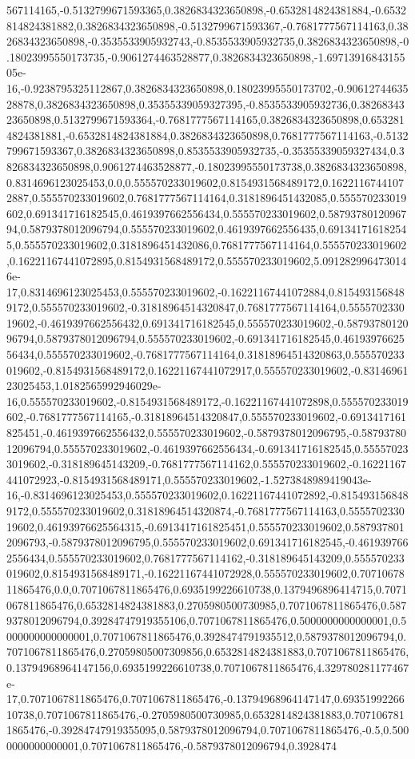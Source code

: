 567114165,-0.5132799671593365,0.3826834323650898,-0.6532814824381884,-0.6532814824381882,0.3826834323650898,-0.5132799671593367,-0.7681777567114163,0.3826834323650898,-0.3535533905932743,-0.8535533905932735,0.3826834323650898,-0.18023995550173735,-0.9061274463528877,0.3826834323650898,-1.6971391684315505e-16,-0.9238795325112867,0.3826834323650898,0.18023995550173702,-0.9061274463528878,0.3826834323650898,0.35355339059327395,-0.8535533905932736,0.3826834323650898,0.5132799671593364,-0.7681777567114165,0.3826834323650898,0.6532814824381881,-0.6532814824381884,0.3826834323650898,0.7681777567114163,-0.5132799671593367,0.3826834323650898,0.8535533905932735,-0.35355339059327434,0.3826834323650898,0.9061274463528877,-0.18023995550173738,0.3826834323650898,0.8314696123025453,0.0,0.555570233019602,0.8154931568489172,0.16221167441072887,0.555570233019602,0.7681777567114164,0.3181896451432085,0.555570233019602,0.691341716182545,0.4619397662556434,0.555570233019602,0.5879378012096794,0.5879378012096794,0.555570233019602,0.4619397662556435,0.691341716182545,0.555570233019602,0.3181896451432086,0.7681777567114164,0.555570233019602,0.16221167441072895,0.8154931568489172,0.555570233019602,5.0912829964730146e-17,0.8314696123025453,0.555570233019602,-0.16221167441072884,0.8154931568489172,0.555570233019602,-0.31818964514320847,0.7681777567114164,0.555570233019602,-0.4619397662556432,0.691341716182545,0.555570233019602,-0.5879378012096794,0.5879378012096794,0.555570233019602,-0.691341716182545,0.4619397662556434,0.555570233019602,-0.7681777567114164,0.31818964514320863,0.555570233019602,-0.8154931568489172,0.16221167441072917,0.555570233019602,-0.8314696123025453,1.0182565992946029e-16,0.555570233019602,-0.8154931568489172,-0.16221167441072898,0.555570233019602,-0.7681777567114165,-0.31818964514320847,0.555570233019602,-0.6913417161825451,-0.4619397662556432,0.555570233019602,-0.5879378012096795,-0.5879378012096794,0.555570233019602,-0.4619397662556434,-0.691341716182545,0.555570233019602,-0.318189645143209,-0.7681777567114162,0.555570233019602,-0.16221167441072923,-0.8154931568489171,0.555570233019602,-1.5273848989419043e-16,-0.8314696123025453,0.555570233019602,0.16221167441072892,-0.8154931568489172,0.555570233019602,0.31818964514320874,-0.7681777567114163,0.555570233019602,0.46193976625564315,-0.6913417161825451,0.555570233019602,0.5879378012096793,-0.5879378012096795,0.555570233019602,0.691341716182545,-0.4619397662556434,0.555570233019602,0.7681777567114162,-0.318189645143209,0.555570233019602,0.8154931568489171,-0.16221167441072928,0.555570233019602,0.7071067811865476,0.0,0.7071067811865476,0.6935199226610738,0.1379496896414715,0.7071067811865476,0.6532814824381883,0.2705980500730985,0.7071067811865476,0.5879378012096794,0.39284747919355106,0.7071067811865476,0.5000000000000001,0.5000000000000001,0.7071067811865476,0.3928474791935512,0.5879378012096794,0.7071067811865476,0.27059805007309856,0.6532814824381883,0.7071067811865476,0.13794968964147156,0.6935199226610738,0.7071067811865476,4.329780281177467e-17,0.7071067811865476,0.7071067811865476,-0.13794968964147147,0.6935199226610738,0.7071067811865476,-0.2705980500730985,0.6532814824381883,0.7071067811865476,-0.39284747919355095,0.5879378012096794,0.7071067811865476,-0.5,0.5000000000000001,0.7071067811865476,-0.5879378012096794,0.3928474